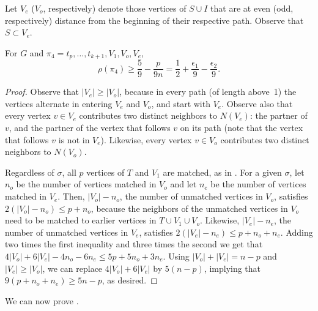 Let $V_e$ ($V_o$, respectively) denote those vertices of $S \cup I$ that are at even (odd, respectively) distance from the beginning of their respective path. Observe that $S \subset V_e$.

\begin{lemma}
	\label{lem:sort2}
	For $G$ and $\pi_4 = t_p, \ldots, t_{k+1}, V_1, V_o, V_e$,
	$$\rho(\pi_4) \ge \frac{5}{9} - \frac{p}{9n} = \frac{1}{2} + \frac{\epsilon_1}{9} - \frac{\epsilon_2}{9}.$$
\end{lemma}

\begin{proof}
	Observe that $|V_e| \ge |V_o|$, because in every path (of length above~1) the vertices alternate in entering $V_e$ and $V_o$, and start with $V_e$. Observe also that every vertex $v \in V_e$ contributes two distinct neighbors to $N(V_e)$: the partner of $v$, and the partner of the vertex that follows $v$ on its path (note that the vertex that follows $v$ is not in $V_e$). Likewise, every vertex $v \in V_o$ contributes two distinct neighbors to $N(V_o)$.
	
	
	
	
	
	Regardless of $\sigma$, all $p$ vertices of $T$ and $V_1$ are matched, as in . For a given $\sigma$, let $n_o$ be the number of vertices matched in $V_o$ and let  $n_e$ be the number of vertices matched in $V_e$.
	Then, $|V_o| - n_o$, the number of unmatched vertices  in $V_o$, satisfies $2(|V_o| - n_o) \le p + n_o$, because the neighbors of the unmatched vertices in $V_o$ need to be matched to earlier vertices in $T \cup V_1 \cup V_o$.
	Likewise,  $|V_e| - n_e$, the number of unmatched vertices  in $V_e$, satisfies $2(|V_e| - n_e) \le p + n_o + n_e$.
	Adding two times the first inequality and three times the second we get that $4|V_o| + 6|V_e| - 4n_o - 6n_e \le 5p + 5n_o + 3n_e$. Using $|V_o| + |V_e| = n-p$ and $|V_e| \ge |V_o|$, we can replace $4|V_o| + 6|V_e|$ by $5(n-p)$, implying that $9(p + n_o + n_e) \ge 5n - p$, as desired.
\end{proof}

%

We can now prove .

